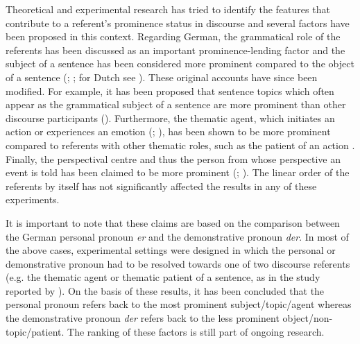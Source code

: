 \documentclass[output=paper,colorlinks,citecolor=brown]{langscibook}
\begin{document}
Theoretical and experimental research has tried to identify the features that contribute to a referent’s prominence status in discourse and several factors have been proposed in this context. Regarding German, the grammatical role of the referents has been discussed as an important prominence-lending factor and the subject of a sentence has been considered more prominent compared to the object of a sentence (\citealt{BoschEtAl2003}; \citealt{BoschEtAl2007}; for Dutch see \citealt{KaiserTrueswell2004}). These original accounts have since been modified. For example, it has been proposed that sentence topics which often appear as the grammatical subject of a sentence are more prominent than other discourse participants (\citealt{BoschUmbach2007}). Furthermore, the thematic agent, which initiates an action or experiences an emotion (\citealt{Dowty1991}; \citealt{Primus2012}), has been shown to be more prominent compared to referents with other thematic roles, such as the patient of an action \citep{SchumacherEtAl2016}. Finally, the perspectival centre and thus the person from whose perspective an event is told has been claimed to be more prominent (\citealt{HinterwimmerBosch2016}; \citealt{Hinterwimmer2019}). The linear order of the referents by itself has not significantly affected the results in any of these experiments. 

It is important to note that these claims are based on the comparison between the German personal pronoun \textit{er} and the demonstrative pronoun \textit{der}. In most of the above cases, experimental settings were designed in which the personal or demonstrative pronoun had to be resolved towards one of two discourse referents (e.g. the thematic agent or thematic patient of a sentence, as in the study reported by \citealt{SchumacherEtAl2016}). On the basis of these results, it has been concluded that the personal pronoun refers back to the most prominent subject/topic/agent whereas the demonstrative pronoun \textit{der} refers back to the less prominent object/non-topic/patient. The ranking of these factors is still part of ongoing research. 
\end{document}
